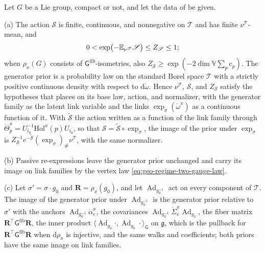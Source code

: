 Let $G$ be a Lie group, compact or not, and let the data of  be given.

(a) The action $\mathscr S$ is finite, continuous, and nonnegative on $\mathscr T$ and has finite
$\nu^{\mathscr T}$-mean, and
\begin{equation}
0<\exp\bigl(-\mathbb E_{\nu^{\mathscr T}}\mathscr S\bigr)\leq Z_{\mathscr S}\leq1;
\label{eq:link-normalizer-bounds}
\end{equation}
when $\rho_x(G)$ consists of $\mathsf G^{\mathrm{fib}}$-isometries, also
$Z_{\mathscr S}\geq\exp(-2\dim\mathbb V\sum_p\mathrm c_p)$. The generator prior is a probability law on
the standard Borel space $\mathscr T$ with a strictly positive continuous density with respect to
$\mathrm d\mathring\omega$. Hence $\nu^{\mathscr T}$, $\mathscr S$, and $Z_{\mathscr S}$ satisfy the
hypotheses that  places on its base law, action, and normalizer, with the
generator family as the latent link variable and the links $\exp_\sigma(\mathring\omega^x)$ as a
continuous function of it. With $\widetilde{\mathscr S}$ the action written as a function of the link
family through $\mathring\Theta^x_p=U_{i_0}^{-1}\mathrm{Hol}^x(p)U_{i_0}$, so that
$\mathscr S=\widetilde{\mathscr S}\circ\exp_\sigma$, the image of the prior under $\exp_\sigma$ is
$Z_{\mathscr S}^{-1}e^{-\widetilde{\mathscr S}}(\exp_\sigma)_\#\nu^{\mathscr T}$, with the same normalizer.

(b) Passive re-expressions leave the generator prior unchanged and carry its image on link families by
the vertex law \cref{eq:geo-regime-two-gauge-law}.

(c) Let $\sigma'=\sigma\cdot g_0$ and $\mathbf R=\rho_x(g_0)$, and let $\operatorname{Ad}_{g_0^{-1}}$ act
on every component of $\mathscr T$. The image of the generator prior under $\operatorname{Ad}_{g_0^{-1}}$
is the generator prior relative to $\sigma'$ with the anchors
$\operatorname{Ad}_{g_0^{-1}}\mathring\alpha^x_e$, the covariances
$\operatorname{Ad}_{g_0^{-1}}\mathring\Sigma^x_e\operatorname{Ad}_{g_0}$, the fiber matrix
$\mathbf R^\top\mathsf G^{\mathrm{fib}}\mathbf R$, the inner product
$\langle\operatorname{Ad}_{g_0}\cdot,\operatorname{Ad}_{g_0}\cdot\rangle_{\mathsf G}$ on $\mathfrak g$, which is the
pullback for $\mathbf R^\top\mathsf G^{\mathrm{fib}}\mathbf R$ when $\mathrm d\rho_x$ is injective, and the
same walks and coefficients; both priors have the same image on link families.

